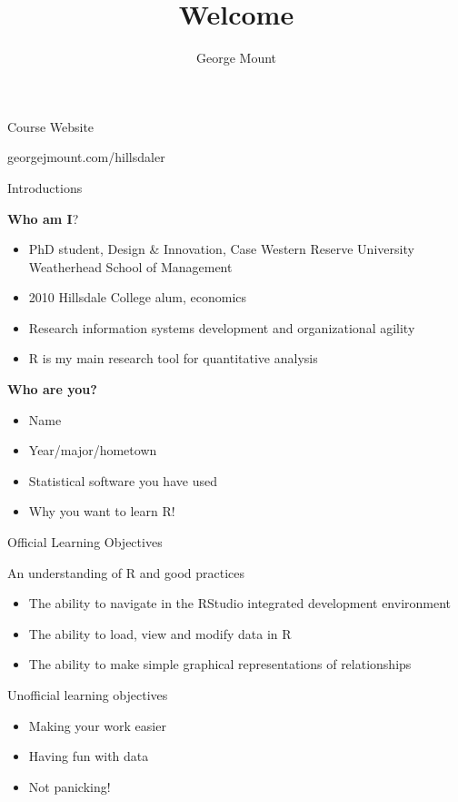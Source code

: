 \documentclass[ignorenonframetext,]{beamer}
\title{Welcome}
\author{George Mount}
\date{}
\providecommand{\tightlist}{%
  \setlength{\itemsep}{0pt}\setlength{\parskip}{0pt}}
\begin{document}
\frame{\titlepage}

\begin{frame}{Course Website}

georgejmount.com/hillsdaler

\end{frame}

\begin{frame}{Introductions}

\begin{block}{\textbf{Who am I}?}

\begin{itemize}
\tightlist
\item
  PhD student, Design \& Innovation, Case Western Reserve University
  Weatherhead School of Management
\item
  2010 Hillsdale College alum, economics
\item
  Research information systems development and organizational agility
\item
  R is my main research tool for quantitative analysis
\end{itemize}

\end{block}

\end{frame}

\begin{frame}

\begin{block}{\textbf{Who are you?}}

\begin{itemize}
\tightlist
\item
  Name
\item
  Year/major/hometown
\item
  Statistical software you have used
\item
  Why you want to learn R!
\end{itemize}

\end{block}

\end{frame}

\begin{frame}{Official Learning Objectives}

An understanding of R and good practices

\begin{itemize}
\tightlist
\item
  The ability to navigate in the RStudio integrated development
  environment
\item
  The ability to load, view and modify data in R
\item
  The ability to make simple graphical representations of relationships
\end{itemize}

\end{frame}

\begin{frame}{Unofficial learning objectives}

\begin{itemize}
\tightlist
\item
  Making your work easier
\item
  Having fun with data
\item
  Not panicking!
\end{itemize}

\end{frame}
\end{document}
